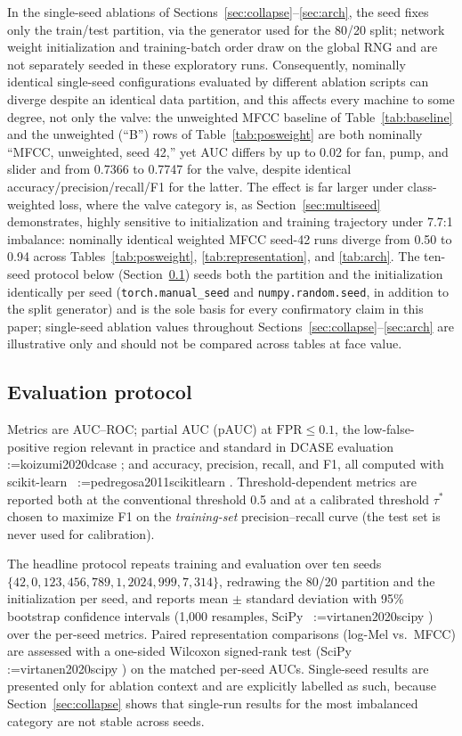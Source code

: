 \documentclass[review,nopreprintline]{elsarticle}
\makeatletter
\newif\ifmc@notfirst
\let\@oldcite\cite
\def\mc@splitcite#1{%
    \begingroup
    \mc@notfirstfalse
    \@for\@citekey:=#1\do{%
      \ifmc@notfirst, \fi
      \mc@notfirsttrue
      \@oldcite{\@citekey}%
    }%
    \endgroup
  }%
\def\cite#1{\protect\mc@splitcite{#1}}%
\makeatother
\begin{document}
In the single-seed ablations of Sections~\ref{sec:collapse}--\ref{sec:arch}, the seed fixes only the train/test partition, via the generator used for the 80/20 split; network weight initialization and training-batch order draw on the global RNG and are not separately seeded in these exploratory runs. Consequently, nominally identical single-seed configurations evaluated by different ablation scripts can diverge despite an identical data partition, and this affects every machine to some degree, not only the valve: the unweighted MFCC baseline of Table~\ref{tab:baseline} and the unweighted (``B'') rows of Table~\ref{tab:posweight} are both nominally ``MFCC, unweighted, seed 42,'' yet AUC differs by up to 0.02 for fan, pump, and slider and from 0.7366 to 0.7747 for the valve, despite identical accuracy/precision/recall/F1 for the latter. The effect is far larger under class-weighted loss, where the valve category is, as Section~\ref{sec:multiseed} demonstrates, highly sensitive to initialization and training trajectory under 7.7:1 imbalance: nominally identical weighted MFCC seed-42 runs diverge from 0.50 to 0.94 across Tables~\ref{tab:posweight}, \ref{tab:representation}, and \ref{tab:arch}. The ten-seed protocol below (Section~\ref{sec:protocol}) seeds both the partition and the initialization identically per seed (\texttt{torch.manual\_seed} and \texttt{numpy.random.seed}, in addition to the split generator) and is the sole basis for every confirmatory claim in this paper; single-seed ablation values throughout Sections~\ref{sec:collapse}--\ref{sec:arch} are illustrative only and should not be compared across tables at face value.

\subsection{Evaluation protocol}
\label{sec:protocol}
Metrics are AUC--ROC; partial AUC (pAUC) at $\mathrm{FPR}\le0.1$, the low-false-positive region relevant in practice and standard in DCASE evaluation~\cite{koizumi2020dcase}; and accuracy, precision, recall, and F1, all computed with scikit-learn~\cite{pedregosa2011scikitlearn}. Threshold-dependent metrics are reported both at the conventional threshold 0.5 and at a calibrated threshold $\tau^\ast$ chosen to maximize F1 on the \emph{training-set} precision--recall curve (the test set is never used for calibration).

The headline protocol repeats training and evaluation over ten seeds $\{42, 0, 123, 456, 789, 1, 2024, 999, 7, 314\}$, redrawing the 80/20 partition and the initialization per seed, and reports mean $\pm$ standard deviation with 95\% bootstrap confidence intervals (1{,}000 resamples, SciPy~\cite{virtanen2020scipy}) over the per-seed metrics. Paired representation comparisons (log-Mel vs.\ MFCC) are assessed with a one-sided Wilcoxon signed-rank test (SciPy~\cite{virtanen2020scipy}) on the matched per-seed AUCs. Single-seed results are presented only for ablation context and are explicitly labelled as such, because Section~\ref{sec:collapse} shows that single-run results for the most imbalanced category are not stable across seeds.
\end{document}
